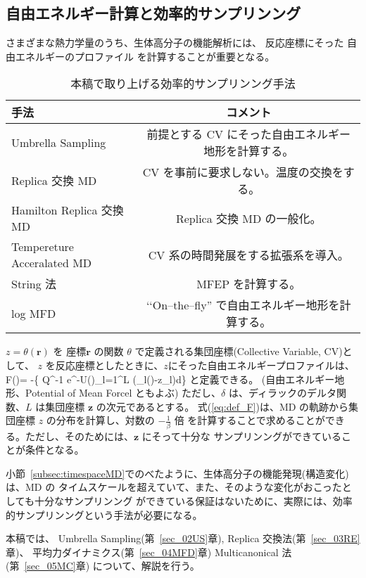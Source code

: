 \subsection{自由エネルギー計算と効率的サンプリンング}
\label{subsec:FreeEnergyintro}

さまざまな熱力学量のうち、生体高分子の機能解析には、
反応座標にそった
自由エネルギーのプロファイル
を計算することが重要となる。
\begin{table}[hbtp]
  \caption{本稿で取り上げる効率的サンプリンング手法}
  \label{table:enganced_sampling}
  \centering
  \begin{tabular}{lc}
    \hline
    手法  & コメント  \\
    \hline \hline
    Umbrella Sampling &  前提とする CV にそった自由エネルギー地形を計算する。\\
    Replica 交換 MD   &  CV を事前に要求しない。温度の交換をする。  \\
    Hamilton Replica 交換 MD  &  Replica 交換 MD の一般化。 \\
    Tempereture Acceralated MD &  CV 系の時間発展をする拡張系を導入。 \\
    String 法 & MFEP を計算する。 \\
    log MFD  & \lq \lq On--the--fly'' で自由エネルギー地形を計算する。 \\
    \hline
  \end{tabular}
\end{table}
$z=\theta(\mathbf{r})$ を
座標$\mathbf{r}$ の関数 $\theta$ で定義される集団座標(Collective Variable, CV)として、
$z$ を反応座標としたときに、$z$にそった自由エネルギープロファイルは、
\beq
F()=
-\ln \{ Q^{-1} \int e^{-\beta U()}\prod_{l=1}^{L}
\delta(\theta_{l}()-z_{l})d\}
\label{eq:def_F}
\eeq
と定義できる。
(自由エネルギー地形、Potential of Mean Forcel ともよぶ)
ただし、$\delta$ は、ディラックのデルタ関数、$L$ は集団座標 $\mathbf{z}$ の次元であるとする。
式(\ref{eq:def_F})は、MD の軌跡から集団座標 $z$ の分布を計算し、対数の $-\frac{1}{\beta}$ 倍
を計算することで求めることができる。ただし、そのためには、$\mathbf{z}$ にそって十分な
サンプリンングができていることが条件となる。

小節~\ref{subsec:timespaceMD}でのべたように、生体高分子の機能発現(構造変化)は、MD の
タイムスケールを超えていて、また、そのような変化がおこったとしても十分なサンプリンング
ができている保証はないために、実際には、効率的サンプリンングという手法が必要になる。

本稿では、
 Umbrella Sampling(第~\ref{sec_02US}章),
 Replica 交換法(第~\ref{sec_03RE}章)、
 平均力ダイナミクス(第~\ref{sec_04MFD}章)
 Multicanonical 法(第~\ref{sec_05MC}章)
について、解説を行う。
